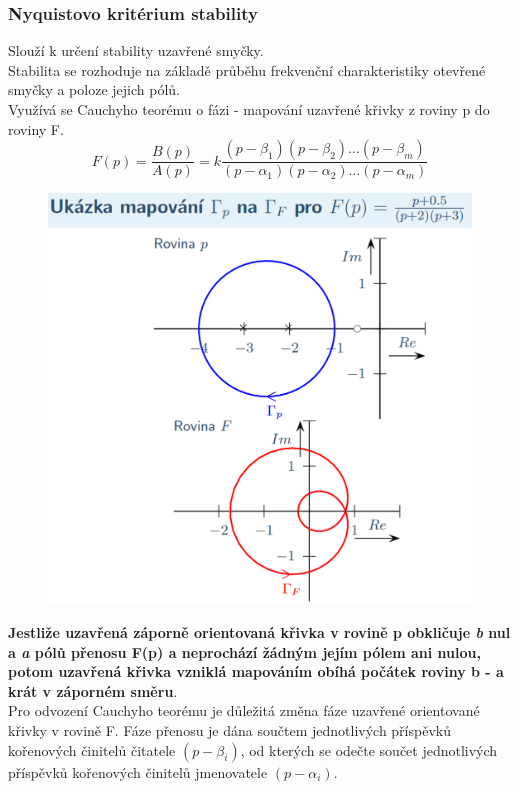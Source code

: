 \subsubsection*{Nyquistovo kritérium stability}
Slouží k určení stability uzavřené smyčky.\\
Stabilita se rozhoduje na základě průběhu frekvenční charakteristiky otevřené smyčky a poloze jejich pólů.\\
Využívá se Cauchyho teorému o fázi - mapování uzavřené křivky z roviny p do roviny F.\\
\begin{equation}
    F(p) = \frac{B(p)}{A(p)} = k\frac{(p-\beta_1)(p-\beta_2)\dots (p-\beta_m)}{(p-\alpha_1)(p-\alpha_2)\dots (p-\alpha_m)}
\end{equation}
\begin{figure}[H]
    \includegraphics*[scale = 0.3]{images/NyQuistMapovani.png}
\end{figure}
\textbf{Jestliže uzavřená záporně orientovaná křivka v rovině p obkličuje \textit{b} nul a \textit{a} pólů přenosu F(p) a neprochází žádným jejím pólem ani nulou, potom uzavřená křivka vzniklá mapováním obíhá počátek roviny b - a krát v záporném směru}.\\
Pro odvození Cauchyho teorému je důležitá změna fáze uzavřené orientované křivky v rovině F. Fáze přenosu je dána součtem jednotlivých příspěvků kořenových činitelů čitatele $(p - \beta_i)$, od  kterých se odečte součet jednotlivých příspěvků kořenových činitelů jmenovatele $(p - \alpha_i)$.\\
\newpage

